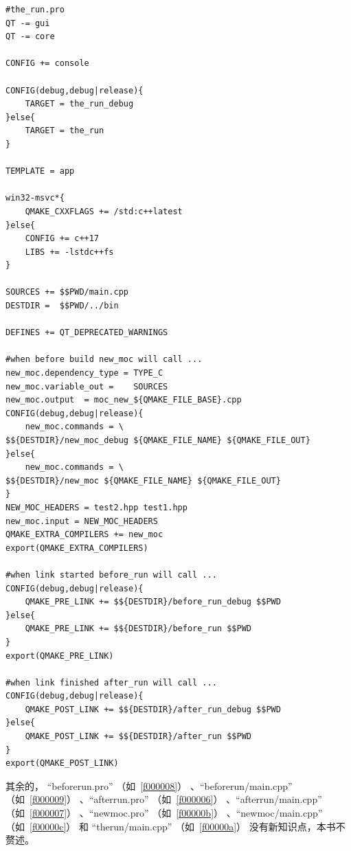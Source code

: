\FloatBarrier
\begin{lstlisting}[label=f000005,
caption=GoodLuck,
title=\lstlistingname\ \thelstlisting
]
#the_run.pro
QT -= gui
QT -= core

CONFIG += console

CONFIG(debug,debug|release){
    TARGET = the_run_debug
}else{
    TARGET = the_run
}

TEMPLATE = app

win32-msvc*{
    QMAKE_CXXFLAGS += /std:c++latest
}else{
    CONFIG += c++17
    LIBS += -lstdc++fs
}

SOURCES += $$PWD/main.cpp
DESTDIR =  $$PWD/../bin

DEFINES += QT_DEPRECATED_WARNINGS

#when before build new_moc will call ...
new_moc.dependency_type = TYPE_C
new_moc.variable_out =    SOURCES
new_moc.output  = moc_new_${QMAKE_FILE_BASE}.cpp
CONFIG(debug,debug|release){
    new_moc.commands = \
$${DESTDIR}/new_moc_debug ${QMAKE_FILE_NAME} ${QMAKE_FILE_OUT}
}else{
    new_moc.commands = \
$${DESTDIR}/new_moc ${QMAKE_FILE_NAME} ${QMAKE_FILE_OUT}
}
NEW_MOC_HEADERS = test2.hpp test1.hpp
new_moc.input = NEW_MOC_HEADERS
QMAKE_EXTRA_COMPILERS += new_moc
export(QMAKE_EXTRA_COMPILERS)

#when link started before_run will call ...
CONFIG(debug,debug|release){
    QMAKE_PRE_LINK += $${DESTDIR}/before_run_debug $$PWD
}else{
    QMAKE_PRE_LINK += $${DESTDIR}/before_run $$PWD
}
export(QMAKE_PRE_LINK)

#when link finished after_run will call ...
CONFIG(debug,debug|release){
    QMAKE_POST_LINK += $${DESTDIR}/after_run_debug $$PWD
}else{
    QMAKE_POST_LINK += $${DESTDIR}/after_run $$PWD
}
export(QMAKE_POST_LINK)
\end{lstlisting}          %



其余的，
“before\underline{\hspace{0.5em}}run.pro”
（如\lstlistingname\ \ref{f000008}）
、“before\underline{\hspace{0.5em}}run/main.cpp”
（如\lstlistingname\ \ref{f000009}）
、“after\underline{\hspace{0.5em}}run.pro”
（如\lstlistingname\ \ref{f000006}）
、“after\underline{\hspace{0.5em}}run/main.cpp”
（如\lstlistingname\ \ref{f000007}）
、“new\underline{\hspace{0.5em}}moc.pro”
（如\lstlistingname\ \ref{f00000b}）
、“new\underline{\hspace{0.5em}}moc/main.cpp”
（如\lstlistingname\ \ref{f00000c}）
和
“the\underline{\hspace{0.5em}}run/main.cpp”
（如\lstlistingname\ \ref{f00000a}）
没有新知识点，本书不赘述。

